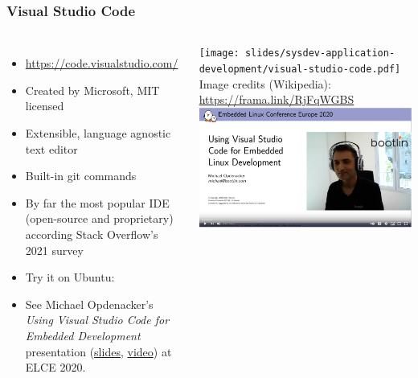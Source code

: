 \begin{frame}
  \frametitle{Visual Studio Code}
  \begin{columns}
    \begin{itemize}
    \item \url{https://code.visualstudio.com/}
    \item Created by Microsoft, MIT licensed
    \item Extensible, language agnostic text editor
    \item Built-in git commands
    \item By far the most popular IDE (open-source and proprietary)
          according Stack Overflow's 2021 survey
    \item Try it on Ubuntu:\\
    \item See Michael Opdenacker's {\em Using Visual Studio Code for Embedded Development} presentation
          (\href{https://bootlin.com/pub/conferences/2020/elce/opdenacker-using-vs-code-for-embedded-development/}{slides},
          \href{https://www.youtube.com/watch?v=YGOZIIOWujc}{video}) at ELCE 2020.
    \end{itemize}
    \begin{center}
    \texttt{[image: slides/sysdev-application-development/visual-studio-code.pdf]}\\
    \tiny Image credits (Wikipedia): \url{https://frama.link/RjFqWGBS}\\
    \vspace{0.5cm}
    \includegraphics[width=\textwidth]{common/opdenacker-using-vscode.jpg}
    \end{center}
  \end{columns}
\end{frame}


